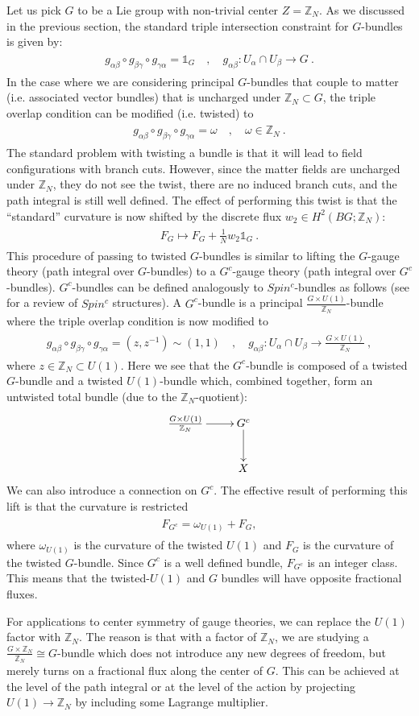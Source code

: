 \documentclass[11pt]{article}
\newcommand{\eq}[1]{\begin{align}\begin{split}#1\end{split}\end{align}}
\def\IZ{{\mathbb{Z}}}
\def\IZN{{\mathbb{Z}_N}}
\begin{document}
Let us pick $G$ to be a Lie group with non-trivial center $Z=\IZ_N$. As we discussed in the previous section, the standard triple intersection constraint for $G$-bundles is given by:
\eq{
g_{\alpha\beta}\circ g_{\beta\gamma}\circ g_{\gamma \alpha}=\mathds{1}_G\quad, \quad g_{\alpha\beta}:U_\alpha\cap U_\beta\to G~.
}
In the case where we are considering principal $G$-bundles that couple to matter (i.e. associated vector bundles) that is uncharged under $\IZN\subset G$, the triple overlap condition can be modified (i.e. twisted) to 
\eq{
g_{\alpha\beta}\circ g_{\beta\gamma}\circ g_{\gamma \alpha}=\omega\quad, \quad \omega\in \IZN~.
}
The standard problem with twisting a bundle is that it will lead to field configurations with branch cuts. However, since the matter fields are uncharged under $\IZN$, they do not see the twist, there are no induced branch cuts, and the path integral is still well defined. The effect of performing this twist is that the ``standard'' curvature is now shifted by the discrete flux $w_2\in H^2(BG;\IZN)$:
\eq{
F_G\longmapsto F_G+\frac{1}{N}w_2\mathds{1}_G~.
}
This procedure of passing to twisted $G$-bundles is similar to lifting the $G$-gauge theory (path integral over $G$-bundles) to a $G^c$-gauge theory (path integral over $G^c$-bundles). $G^c$-bundles can be defined analogously to $Spin^c$-bundles as follows (see \cite{GMspinc} for a  review of $Spin^c$ structures).
 A $G^c$-bundle is a principal $\frac{G\times U(1)}{\IZ_N}$-bundle where the triple overlap condition is now  modified to 
\eq{
g_{\alpha\beta}\circ g_{\beta\gamma}\circ g_{\gamma \alpha}=(z,z^{-1})\sim (1,1)\quad, \quad g_{\alpha\beta}:U_\alpha\cap U_\beta\to \frac{G\times U(1)}{\IZ_N}~,
}
where $z\in \IZ_N \subset U(1)$. Here we see that the $G^c$-bundle is composed of a twisted $G$-bundle and a twisted $U(1)$-bundle which, combined together, form an untwisted total bundle (due to the $\IZ_N$-quotient):
\eq{
\xymatrix{
\frac{G\times U(1)}{\IZ_N}\ar[r]&G^c\ar[d]\\
&X
}
}
We can also introduce a connection on $G^c$. The effective result of performing this lift is that the curvature is restricted 
\eq{
F_{G^c}={\omega}_{U(1)}+F_G,	
}
where ${\omega}_{U(1)}$ is the curvature of the twisted $U(1)$  and $F_G$ is the curvature of the twisted $G$-bundle. Since $G^c$ is a well defined bundle, $F_{G^c}$ is an integer class. This means that the twisted-$U(1)$ and $G$ bundles will have opposite fractional fluxes.  

For applications to center symmetry of gauge theories, we can replace the $U(1)$ factor with $\IZ_N$. The reason is that  with a factor of $\IZ_N$, we are studying a $\frac{G\times \IZ_N}{\IZ_N}\cong G$-bundle which does not introduce any new degrees of freedom, but merely turns on a fractional flux along the center of $G$. 
 This can be achieved at the level of the path integral or at the level of the action by projecting $U(1)\to \IZN$ by including some Lagrange multiplier. 
 
\end{document}
